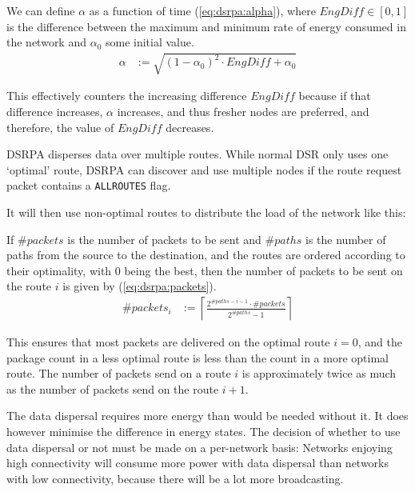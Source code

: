We can define $\alpha$ as a function of time (\ref{eq:dsrpa:alpha}),
where $EngDiff \in [0,1]$ is the difference between the maximum and minimum rate
of energy consumed in the network and $\alpha_{0}$ some initial value.
\begin{align}
    \alpha &:= \sqrt{(1-\alpha_{0})^{2} \cdot EngDiff + \alpha_{0}}
    \label{eq:dsrpa:alpha}
\end{align}

This effectively counters the increasing difference $EngDiff$ because if that
difference increases, $\alpha$ increases, and thus fresher nodes are preferred,
and therefore, the value of $EngDiff$ decreases.

DSRPA disperses data over multiple routes.  While normal DSR only uses one
`optimal' route, DSRPA can discover and use multiple nodes if the route request
packet contains a \texttt{ALLROUTES} flag.

It will then use non-optimal routes to distribute the load of the network like
this:

If $\#packets$ is the number of packets to be sent and
$\#paths$ is the number of paths from the source to the
destination, and the routes are ordered according to their optimality,
with 0 being the best, then the number of packets to be sent on the route $i$
is given by (\ref{eq:dsrpa:packets}).
\begin{align}
     \#packets_{i} &:= \left\lceil \frac{2^{\# paths - i - 1} \cdot \# packets}{2^{\#paths} - 1} \right\rceil
     \label{eq:dsrpa:packets}
\end{align}

This ensures that most packets are delivered on the optimal route $i=0$, and
the package count in a less optimal route is less than the count in a more
optimal route. The number of packets send on a route $i$ is approximately
twice as much as the number of packets send on the route $i+1$.

The data dispersal requires more energy than would be needed without it. It
does however minimise the difference in energy states. The decision of whether
to use data dispersal or not must be made on a per-network basis: Networks
enjoying high connectivity will consume more power with data dispersal than
networks with low connectivity, because there will be a lot more broadcasting.
